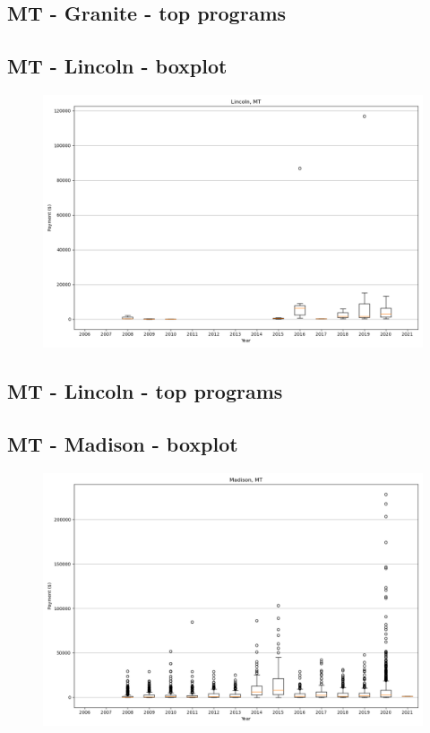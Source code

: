 \subsection*{MT - Granite - top programs}

\newpage
\subsection*{MT - Lincoln - boxplot}
\begin{figure}[h]
\centering
\includegraphics[width=7in]{../output/boxplots/counties/Lincoln-MT_boxplot.png}
\end{figure}


\subsection*{MT - Lincoln - top programs}

\newpage
\subsection*{MT - Madison - boxplot}
\begin{figure}[h]
\centering
\includegraphics[width=7in]{../output/boxplots/counties/Madison-MT_boxplot.png}
\end{figure}


